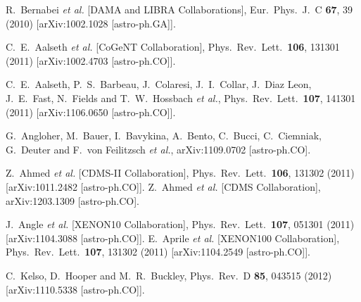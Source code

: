   R.~Bernabei {\it et al.}  [DAMA and LIBRA Collaborations],
  Eur.\ Phys.\ J.\ C {\bf 67}, 39 (2010)
  [arXiv:1002.1028 [astro-ph.GA]].

  C.~E.~Aalseth {\it et al.}  [CoGeNT Collaboration],
  Phys.\ Rev.\ Lett.\  {\bf 106}, 131301 (2011)
  [arXiv:1002.4703 [astro-ph.CO]].

  C.~E.~Aalseth, P.~S.~Barbeau, J.~Colaresi, J.~I.~Collar, J.~Diaz Leon, J.~E.~Fast, N.~Fields and T.~W.~Hossbach {\it et al.},
  Phys.\ Rev.\ Lett.\  {\bf 107}, 141301 (2011)
  [arXiv:1106.0650 [astro-ph.CO]].

  G.~Angloher, M.~Bauer, I.~Bavykina, A.~Bento, C.~Bucci, C.~Ciemniak, G.~Deuter and F.~von Feilitzsch {\it et al.},
  arXiv:1109.0702 [astro-ph.CO].

  Z.~Ahmed {\it et al.}  [CDMS-II Collaboration],
  Phys.\ Rev.\ Lett.\  {\bf 106}, 131302 (2011)
  [arXiv:1011.2482 [astro-ph.CO]].
  Z.~Ahmed {\it et al.}  [CDMS Collaboration],
  arXiv:1203.1309 [astro-ph.CO].

  J.~Angle {\it et al.}  [XENON10 Collaboration],
  Phys.\ Rev.\ Lett.\  {\bf 107}, 051301 (2011)
  [arXiv:1104.3088 [astro-ph.CO]].
  E.~Aprile {\it et al.}  [XENON100 Collaboration],
  Phys.\ Rev.\ Lett.\  {\bf 107}, 131302 (2011)
  [arXiv:1104.2549 [astro-ph.CO]].

  C.~Kelso, D.~Hooper and M.~R.~Buckley,
  Phys.\ Rev.\ D {\bf 85}, 043515 (2012)
  [arXiv:1110.5338 [astro-ph.CO]].


